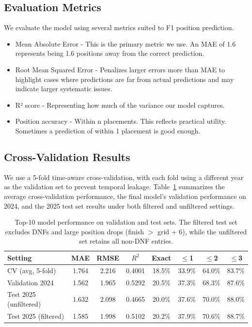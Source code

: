 \documentclass{article}
\begin{document}
\subsection{Evaluation Metrics}

We evaluate the model using several metrics suited to F1 position prediction.

\begin{itemize}
    \item Mean Absolute Error - This is the primary metric we use. An MAE of 1.6 represents being 1.6 positions away from the correct prediction.
    \item Root Mean Squared Error - Penalizes larger errors more than MAE to highlight cases where predictions are far from actual predictions and may indicate larger systematic issues.
    \item R² score - Representing how much of the variance our model captures.
    \item Position accuracy - Within n placements. This reflects practical utility. Sometimes a prediction of within 1 placement is good enough.
\end{itemize}

\subsection{Cross-Validation Results}

We use a 5-fold time-aware cross-validation, with each fold using a different year as the validation set to prevent temporal leakage. Table~\ref{tab:overall-metrics} summarizes the average cross-validation performance, the final model's validation performance on 2024, and the 2025 test set results under both filtered and unfiltered settings.

\begin{table}[t]
  \centering
  \caption{Top-10 model performance on validation and test sets. The filtered test set excludes DNFs and large position drops (finish $>$ grid + 6), while the unfiltered set retains all non-DNF entries.}
  \label{tab:overall-metrics}
  \begin{tabular}{lccccccc}
    \toprule
    Setting & MAE & RMSE & $R^2$ & Exact & $\leq$1 & $\leq$2 & $\leq$3 \\
    \midrule
    CV (avg, 5-fold)       & 1.764 & 2.216 & 0.4001 & 18.5\% & 33.9\% & 64.0\% & 83.7\% \\
    Validation 2024        & 1.562 & 1.965 & 0.5292 & 20.5\% & 37.3\% & 68.3\% & 87.6\% \\
    Test 2025 (unfiltered) & 1.632 & 2.098 & 0.4665 & 20.0\% & 37.6\% & 70.0\% & 88.0\% \\
    Test 2025 (filtered)   & 1.585 & 1.998 & 0.5102 & 20.2\% & 37.9\% & 70.6\% & 88.7\% \\
    \bottomrule
  \end{tabular}
\end{table}
\end{document}
